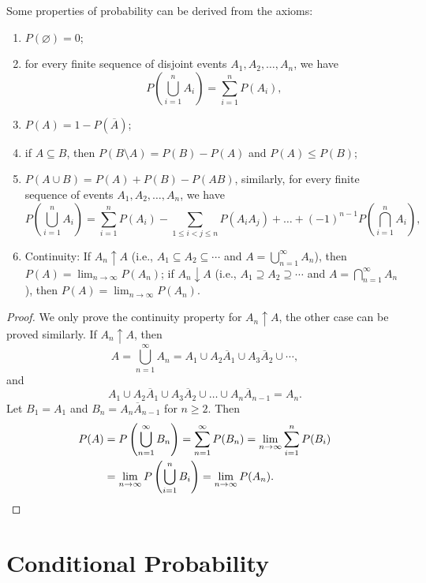 \begin{proposition}
  Some properties of probability can be derived from the axioms:
  \begin{enumerate}
    \item \(P(\varnothing) = 0\);
    \item for every finite sequence of disjoint events \(A_1, A_2, \dots, A_n\), we have
    \[
      P\left(\bigcup_{i=1}^n A_i\right) = \sum_{i=1}^n P(A_i),
    \]
    \item \(P(A) = 1 - P(\overline{A})\);
    \item if \(A \subseteq B\), then \(P(B \setminus A) = P(B) - P(A)\) and \(P(A) \leq P(B)\);
    \item \(P(A \cup B) = P(A) + P(B) - P(A B)\), similarly, for every finite sequence of events \(A_1, A_2, \dots, A_n\), we have
    \[
      P\left(\bigcup_{i=1}^n A_i\right) = \sum_{i=1}^n P(A_i) - \sum_{1 \leq i < j \leq n} P(A_i A_j) + \dots + (-1)^{n-1} P\left(\bigcap_{i=1}^n A_i\right),
    \]
    \item Continuity: If \(A_n \uparrow A\) (i.e., \(A_1 \subseteq A_2 \subseteq \cdots\) and \(A = \bigcup_{n=1}^\infty A_n\)), then \(P(A) = \lim_{n \to \infty} P(A_n)\); if \(A_n \downarrow A\) (i.e., \(A_1 \supseteq A_2 \supseteq \cdots\) and \(A = \bigcap_{n=1}^\infty A_n\)), then \(P(A) = \lim_{n \to \infty} P(A_n)\).
  \end{enumerate}
\end{proposition}

\begin{proof}
  We only prove the continuity property for \(A_n \uparrow A\), the other case can be proved similarly.
  If \(A_n \uparrow A\), then
  \[
  A = \bigcup_{n=1}^\infty A_n = A_1 \cup A_2 \overline{A}_1 \cup A_3 \overline{A}_2 \cup \cdots,
  \]
  and
  \[
  A_1 \cup A_2 \overline{A}_1 \cup A_3 \overline{A}_2 \cup \dots \cup A_n \overline{A}_{n-1} = A_n.
  \]
  Let \(B_1 = A_1\) and \(B_n = A_n \overline{A}_{n-1}\) for \(n \geq 2\). Then
  \begin{align*}
    P(A) & = P\left(\bigcup_{n=1}^\infty B_n\right) = \sum_{n=1}^\infty P(B_n) = \lim_{n \to \infty} \sum_{i=1}^n P(B_i) \\
         & = \lim_{n \to \infty} P \left(\bigcup_{i=1}^n B_i\right) = \lim_{n \to \infty} P(A_n). \qedhere
  \end{align*}
\end{proof}

\section{Conditional Probability}


